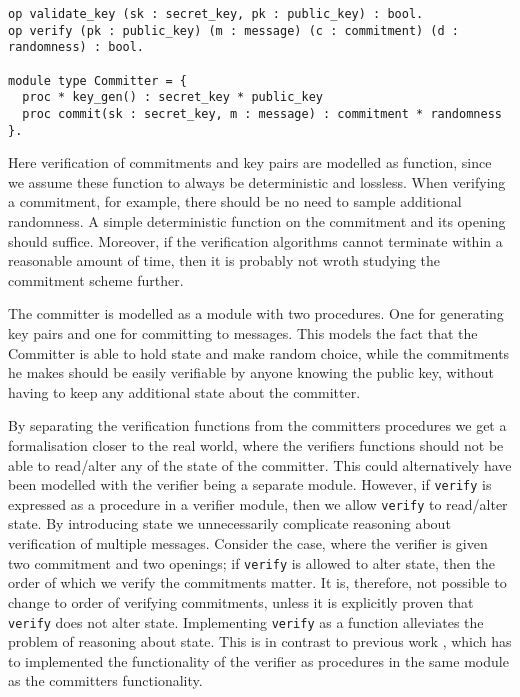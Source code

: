 \begin{lstlisting}[float,label=lst:commitment-procedures,caption= Key-Based commitment specification]
op validate_key (sk : secret_key, pk : public_key) : bool.
op verify (pk : public_key) (m : message) (c : commitment) (d : randomness) : bool.

module type Committer = {
  proc * key_gen() : secret_key * public_key
  proc commit(sk : secret_key, m : message) : commitment * randomness
}.
\end{lstlisting}
Here verification of commitments and key pairs are modelled as function, since
we assume these function to always be deterministic and lossless.
When verifying a commitment, for example, there should be no need to sample
additional randomness. A simple deterministic function on the commitment and its
opening should suffice. Moreover, if the
verification algorithms cannot terminate within a reasonable amount of time,
then it is probably not wroth studying the commitment scheme further.

The committer is modelled as a module with two procedures. One for generating
key pairs and one for committing to messages. This models the fact that the Committer
is able to hold state and make random choice, while the commitments he makes
should be easily verifiable by anyone knowing the public key, without having to
keep any additional state about the committer.

By separating the verification functions from the committers procedures we get a
formalisation closer to the real world, where the verifiers functions should not
be able to read/alter any of the state of the committer. This could alternatively have
been modelled with the verifier being a separate module.
However, if \texttt{verify} is expressed as a procedure in a verifier module,
then we allow \texttt{verify} to read/alter state. By introducing state we
unnecessarily complicate reasoning about verification of multiple messages.
Consider the case, where the verifier is given two commitment and two openings;
if \texttt{verify} is allowed to alter state, then the order of which we verify
the commitments matter. It is, therefore, not possible to change to order of
verifying commitments, unless it is explicitly proven that \texttt{verify} does
not alter state.
Implementing \texttt{verify} as a function alleviates the problem of reasoning
about state.
This is in contrast to previous work \cite{DBLP:journals/corr/MetereD17}, which
has to implemented the functionality of the verifier as procedures in the same
module as the committers functionality.

